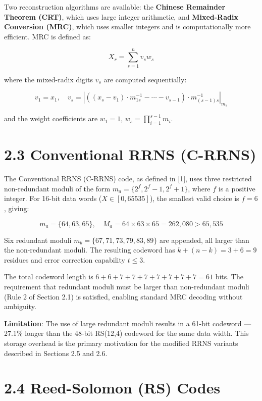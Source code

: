 \documentclass[
  english,
  12pt,
]{report}
\begin{document}
Two reconstruction algorithms are available: the \textbf{Chinese
Remainder Theorem (CRT)}, which uses large integer arithmetic, and
\textbf{Mixed-Radix Conversion (MRC)}, which uses smaller integers and
is computationally more efficient. MRC is defined as:

\[X_r = \sum_{s=1}^{n} v_s w_s\]

where the mixed-radix digits \(v_s\) are computed sequentially:

\[v_1 = x_1, \quad v_s = \left| \left( (x_s - v_1) \cdot m_{1s}^{-1} - \cdots - v_{s-1} \right) \cdot m_{(s-1)s}^{-1} \right|_{m_s}\]

and the weight coefficients are \(w_1 = 1\),
\(w_s = \prod_{i=1}^{s-1} m_i\).

\section{2.3 Conventional RRNS (C-RRNS)}\label{conventional-rrns-c-rrns}

The Conventional RRNS (C-RRNS) code, as defined in {[}1{]}, uses three
restricted non-redundant moduli of the form
\(m_a = \{2^f, 2^f - 1, 2^f + 1\}\), where \(f\) is a positive integer.
For 16-bit data words (\(X \in [0, 65535]\)), the smallest valid choice
is \(f = 6\), giving:

\[m_a = \{64, 63, 65\}, \quad M_a = 64 \times 63 \times 65 = 262{,}080 > 65{,}535\]

Six redundant moduli \(m_b = \{67, 71, 73, 79, 83, 89\}\) are appended,
all larger than the non-redundant moduli. The resulting codeword has
\(k + (n-k) = 3 + 6 = 9\) residues and error correction capability
\(t \leq 3\).

The total codeword length is \(6 + 6 + 7 + 7 + 7 + 7 + 7 + 7 + 7 = 61\)
bits. The requirement that redundant moduli must be larger than
non-redundant moduli (Rule 2 of Section 2.1) is satisfied, enabling
standard MRC decoding without ambiguity.

\textbf{Limitation}: The use of large redundant moduli results in a
61-bit codeword --- 27.1\% longer than the 48-bit RS(12,4) codeword for
the same data width. This storage overhead is the primary motivation for
the modified RRNS variants described in Sections 2.5 and 2.6.

\section{2.4 Reed-Solomon (RS) Codes}\label{reed-solomon-rs-codes}
\end{document}
